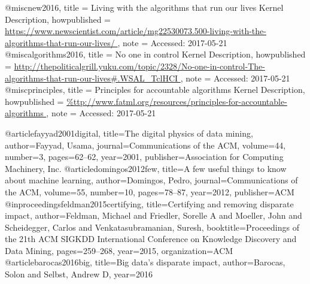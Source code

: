
@misc{new2016,
  title = {{Living with the algorithms that run our lives} Kernel Description},
  howpublished = {\url{https://www.newscientist.com/article/mg22530073.500-living-with-the-algorithms-that-run-our-lives/
}},
  note = {Accessed: 2017-05-21}
}
@misc{algorithms2016,
  title = {{No one in control} Kernel Description},
  howpublished = {\url{http://thepoliticalgrill.yuku.com/topic/2328/No-one-in-control-The-algorithms-that-run-our-lives#.WSAL_TclHCI
}},
  note = {Accessed: 2017-05-21}
}
@misc{principles,
  title = {{Principles for accountable algorithms} Kernel Description},
  howpublished = {\url{%
}},
  note = {Accessed: 2017-05-21}
}


@article{fayyad2001digital,
  title={The digital physics of data mining},
  author={Fayyad, Usama},
  journal={Communications of the ACM},
  volume={44},
  number={3},
  pages={62--62},
  year={2001},
  publisher={Association for Computing Machinery, Inc.}
}
@article{domingos2012few,
  title={A few useful things to know about machine learning},
  author={Domingos, Pedro},
  journal={Communications of the ACM},
  volume={55},
  number={10},
  pages={78--87},
  year={2012},
  publisher={ACM}
}
@inproceedings{feldman2015certifying,
  title={Certifying and removing disparate impact},
  author={Feldman, Michael and Friedler, Sorelle A and Moeller, John and Scheidegger, Carlos and Venkatasubramanian, Suresh},
  booktitle={Proceedings of the 21th ACM SIGKDD International Conference on Knowledge Discovery and Data Mining},
  pages={259--268},
  year={2015},
  organization={ACM}
}
@article{barocas2016big,
  title={Big data's disparate impact},
  author={Barocas, Solon and Selbst, Andrew D},
  year={2016}
}






